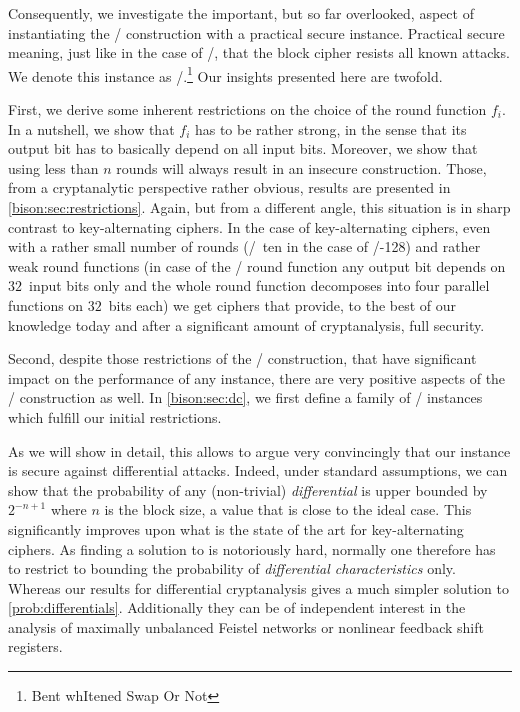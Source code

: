 Consequently, we investigate the important, but so far overlooked, aspect of instantiating the \WSN/ construction with a practical secure instance.
Practical secure meaning, just like in the case of \AES/, that the block cipher resists all known attacks.
We denote this instance as \bison/.\footnote{%
    Bent whItened Swap Or Not
}
Our insights presented here are twofold.

First, we derive some inherent restrictions on the choice of the round function $f_i$.
In a nutshell, we show that $f_i$ has to be rather strong, in the sense that its output bit has to basically depend on all input bits.
Moreover, we show that using less than $n$ rounds will always result in an insecure construction.
Those, from a cryptanalytic perspective rather obvious, results  are presented in \cref{bison:sec:restrictions}.
Again, but from a different angle, this situation is in sharp contrast to key-alternating ciphers.
In the case of key-alternating ciphers, even with a rather small number of rounds (\eg/~ten in the case of \AES/-128) and rather weak round functions (in case of the \AES/ round function any output bit depends on $32$~input bits only and the whole round function decomposes into four parallel functions on $32$~bits each) we get ciphers that provide, to the best of our knowledge today and after a significant amount of cryptanalysis, full security.

Second, despite those restrictions of the \WSN/ construction, that have significant impact on the performance of any instance, there are very positive aspects of the \WSN/ construction as well.
In \cref{bison:sec:dc}, we first define a family of \WSN/ instances which fulfill our initial restrictions.

As we will show in detail, this allows to argue very convincingly that our instance is secure against differential attacks.
Indeed, under standard assumptions, we can show that the probability of any (non-trivial) \emph{differential} is upper bounded by $2^{-n+1}$ where \(n\) is the block size, a value that is close to the ideal case.
This significantly improves upon what is the state of the art for key-alternating ciphers.
As finding a solution to  is notoriously hard, normally one therefore has to restrict to bounding the probability of \emph{differential characteristics} only.
Whereas our results for differential cryptanalysis gives a much simpler solution to \cref{prob:differentials}.
Additionally they can be of independent interest in the analysis of maximally unbalanced Feistel networks or nonlinear feedback shift registers.

